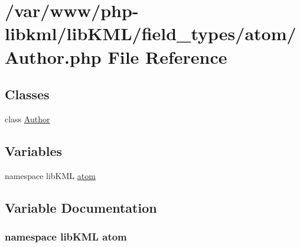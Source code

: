 \hypertarget{Author_8php}{
\section{/var/www/php-\/libkml/libKML/field\_\-types/atom/Author.php File Reference}
\label{d9/d7a/Author_8php}
}
\subsection*{Classes}
\begin{DoxyCompactItemize}
\item 
class \hyperlink{classAuthor}{Author}
\end{DoxyCompactItemize}
\subsection*{Variables}
\begin{DoxyCompactItemize}
\item 
namespace libKML \hyperlink{Author_8php_a394f9de8c2b62e5746df974d1d89617b}{atom}
\end{DoxyCompactItemize}


\subsection{Variable Documentation}
\hypertarget{Author_8php_a394f9de8c2b62e5746df974d1d89617b}{
\subsubsection[{atom}]{\setlength{\rightskip}{0pt plus 5cm}namespace libKML {\bf atom}}}
\label{d9/d7a/Author_8php_a394f9de8c2b62e5746df974d1d89617b}
